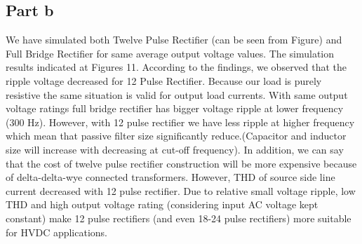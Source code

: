 \documentclass[fleqn, a4paper]{report}
\begin{document}
\subsection*{Part b}
We have simulated both Twelve Pulse Rectifier (can be seen from Figure) and Full Bridge Rectifier for same average output voltage values. The simulation results indicated at Figures 11. According to the findings, we observed that the ripple voltage decreased for 12 Pulse Rectifier. Because our load is purely resistive the same situation is valid for output load currents. With same output voltage ratings full bridge rectifier has bigger voltage ripple at lower frequency (300 Hz). However, with 12 pulse rectifier we have less ripple at higher frequency which mean that passive filter size significantly reduce.(Capacitor and inductor size will increase with decreasing at cut-off frequency). In addition, we can say that the cost of twelve pulse rectifier construction will be more expensive because of delta-delta-wye connected transformers. However, THD of source side line current decreased with 12 pulse rectifier. Due to relative small voltage ripple, low THD and high output voltage rating (considering input AC voltage kept constant) make 12 pulse rectifiers (and even 18-24 pulse rectifiers) more suitable for HVDC applications.
\end{document}
